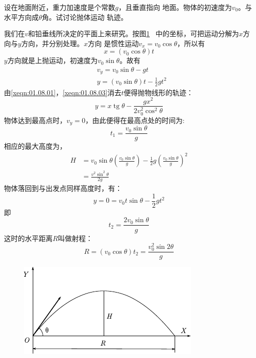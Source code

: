 \example 设在地面附近，重力加速度是个常数$g$，且垂直指向
地面。物体的初速度为$ v_0 $。与水平方向成$ \theta $角。试讨论抛体运动
轨迹。

\discussion 我们在$ v $和铅垂线所决定的平面上来研究。按图\ref{fig:01.16}~
中的坐标，可把运动分解为$ x $方向与$ y $方向，并分别处理。$ x $方向
是惯性运动$ v_x=v_0\cos\theta $，所以有
\begin{equation*}\label{xeqn:01.08.01}
    x=\left(v_0\cos\theta\right)t \tag{1}
\end{equation*}
$ y $方向就是上抛运动，初速度为$ v_0\sin\theta$。故有
\begin{align*}
\label{xeqn:01.08.02} &v_y=v_0\sin\theta-gt \tag{2} \\
\label{xeqn:01.08.03} &y=\left(v_0\sin\theta\right)t-\frac{1}{2}gt^2 \tag{3}
\end{align*}
由\eqref{xeqn:01.08.01}，\eqref{xeqn:01.08.03}消去$ t $便得抛物线形的轨迹：
\begin{equation*}\label{xeqn:01.08.04}
    y=x \operatorname{tg} \theta-\frac{g x^{2}}{2 v_{0}^{2} \cos ^{2} \theta} \tag{4}
\end{equation*}
物体达到最高点时，$ v_y=0 $，由此便得在最高点处的时间为:
\begin{equation*}
    t_{1}=\frac{v_{0} \sin \theta}{g}
\end{equation*}
相应的最大高度为，
\begin{equation*}
    \begin{aligned}
        H &=v_{0} \sin \theta\left(\frac{v_{0} \sin \theta}{g}\right)-\frac{1}{2} g\left(\frac{v_{0} \sin \theta}{g}\right)^{2} \\
        &=\frac{v^{2} \sin ^{2} \theta}{2 g}
    \end{aligned}
\end{equation*}
物体落回到与出发点同样高度时，有：
\begin{equation*}
    y=0=v_{0} t \sin \theta-\frac{1}{2} g t^{2}
\end{equation*}
\clearpage
\noindent 即\vspace{-0.8em}
\begin{equation*}
    t_{2}=\frac{2 v_{0} \sin \theta}{g}
\end{equation*}
这时的水平距离$R$叫做射程：
\begin{equation*}
    R=\left(v_{0} \cos \theta\right) t_{2}=\frac{v_{0}^{2} \sin 2 \theta}{g}
\end{equation*}
\begin{figure}
    \centering
    \includegraphics{figure/fig01.16}
    \caption{}
    \label{fig:01.16}
\end{figure}
